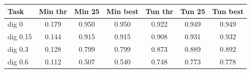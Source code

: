 \begin{tabular}{lcccccc}\hline
Task & Min thr & Min 25 & Min best & Tun thr & Tun 25 & Tun best \\ \hline
dig 0 & 0.179 & 0.950 & 0.950 & 0.922 & 0.949 & 0.949 \\
dig 0.15 & 0.144 & 0.915 & 0.915 & 0.908 & 0.931 & 0.932 \\
dig 0.3 & 0.128 & 0.799 & 0.799 & 0.873 & 0.889 & 0.892 \\
dig 0.6 & 0.112 & 0.507 & 0.540 & 0.748 & 0.773 & 0.778 \\
\hline\end{tabular}
